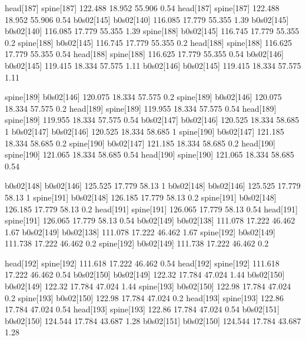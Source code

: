 head[187]    spine[187]    122.488    18.952    55.906    0.54
head[187]    spine[187]    122.488    18.952    55.906    0.54
b0s02[145]    b0s02[140]    116.085    17.779    55.355    1.39
b0s02[145]    b0s02[140]    116.085    17.779    55.355    1.39
spine[188]    b0s02[145]    116.745    17.779    55.355    0.2
spine[188]    b0s02[145]    116.745    17.779    55.355    0.2
head[188]    spine[188]    116.625    17.779    55.355    0.54
head[188]    spine[188]    116.625    17.779    55.355    0.54
b0s02[146]    b0s02[145]    119.415    18.334    57.575    1.11
b0s02[146]    b0s02[145]    119.415    18.334    57.575    1.11


spine[189]    b0s02[146]    120.075    18.334    57.575    0.2
spine[189]    b0s02[146]    120.075    18.334    57.575    0.2
head[189]    spine[189]    119.955    18.334    57.575    0.54
head[189]    spine[189]    119.955    18.334    57.575    0.54
b0s02[147]    b0s02[146]    120.525    18.334    58.685    1
b0s02[147]    b0s02[146]    120.525    18.334    58.685    1
spine[190]    b0s02[147]    121.185    18.334    58.685    0.2
spine[190]    b0s02[147]    121.185    18.334    58.685    0.2
head[190]    spine[190]    121.065    18.334    58.685    0.54
head[190]    spine[190]    121.065    18.334    58.685    0.54


b0s02[148]    b0s02[146]    125.525    17.779    58.13    1
b0s02[148]    b0s02[146]    125.525    17.779    58.13    1
spine[191]    b0s02[148]    126.185    17.779    58.13    0.2
spine[191]    b0s02[148]    126.185    17.779    58.13    0.2
head[191]    spine[191]    126.065    17.779    58.13    0.54
head[191]    spine[191]    126.065    17.779    58.13    0.54
b0s02[149]    b0s02[138]    111.078    17.222    46.462    1.67
b0s02[149]    b0s02[138]    111.078    17.222    46.462    1.67
spine[192]    b0s02[149]    111.738    17.222    46.462    0.2
spine[192]    b0s02[149]    111.738    17.222    46.462    0.2


head[192]    spine[192]    111.618    17.222    46.462    0.54
head[192]    spine[192]    111.618    17.222    46.462    0.54
b0s02[150]    b0s02[149]    122.32    17.784    47.024    1.44
b0s02[150]    b0s02[149]    122.32    17.784    47.024    1.44
spine[193]    b0s02[150]    122.98    17.784    47.024    0.2
spine[193]    b0s02[150]    122.98    17.784    47.024    0.2
head[193]    spine[193]    122.86    17.784    47.024    0.54
head[193]    spine[193]    122.86    17.784    47.024    0.54
b0s02[151]    b0s02[150]    124.544    17.784    43.687    1.28
b0s02[151]    b0s02[150]    124.544    17.784    43.687    1.28


